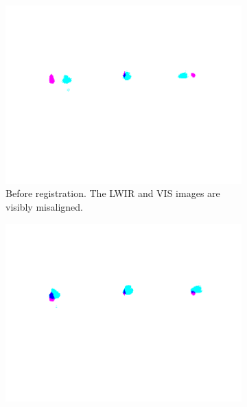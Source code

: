 \documentclass{l4proj}
\begin{document}


\begin{figure}[ht]
  \centering
  \begin{subfigure}[h!]{0.3\textwidth}
    \includegraphics[width=\textwidth, trim={3.5cm 9cm 3.5cm 4.5cm}, clip, frame]{images/registration/unregistered.png}
    \caption{Before registration. The LWIR and VIS images are visibly misaligned.}
  \end{subfigure}
  \begin{subfigure}[h!]{0.3\textwidth}
    \includegraphics[width=\textwidth, trim={3.5cm 9cm 3.5cm 4.5cm}, clip, frame]{images/registration/registered_zoom.png}

\end{subfigure}
\end{figure}
\end{document}
